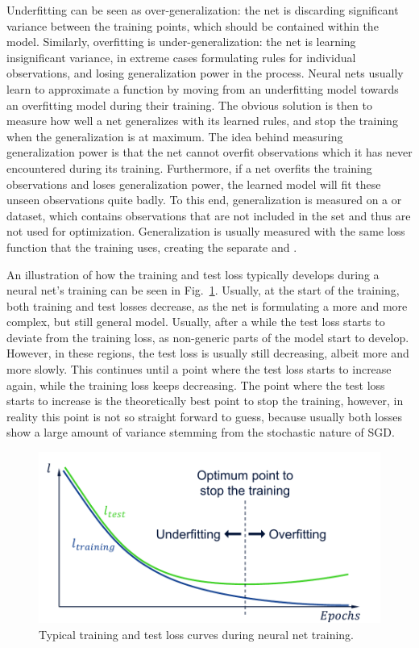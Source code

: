 		 	Underfitting can be seen as over-generalization: the net is discarding significant variance between the training points, which should be contained within the model.
		 	Similarly, overfitting is under-generalization: the net is learning insignificant variance, in extreme cases formulating rules for individual observations, and losing generalization power in the process.
		 	Neural nets usually learn to approximate a function by moving from an underfitting model towards an overfitting model during their training.
		 	The obvious solution is then to measure how well a net generalizes with its learned rules, and stop the training when the generalization is at maximum.
		 	The idea behind measuring generalization power is that the net cannot overfit observations which it has never encountered during its training.
		 	Furthermore, if a net overfits the training observations and loses generalization power, the learned model will fit these unseen observations quite badly.
		 	To this end, generalization is measured on a  or  dataset, which contains observations that are not included in the  set and thus are not used for optimization.
		 	Generalization is usually measured with the same loss function that the training uses, creating the separate  and .
		 	
		 	An illustration of how the training and test loss typically develops during a neural net's training can be seen in Fig.~\ref{fig:learning_losses}.
		 	Usually, at the start of the training, both training and test losses decrease, as the net is formulating a more and more complex, but still general model.
		 	Usually, after a while the test loss starts to deviate from the training loss, as non-generic parts of the model start to develop.
		 	However, in these regions, the test loss is usually still decreasing, albeit more and more slowly.
		 	This continues until a point where the test loss starts to increase again, while the training loss keeps decreasing.
		 	The point where the test loss starts to increase is the theoretically best point to stop the training, however, in reality this point is not so straight forward to guess, because usually both losses show a large amount of variance stemming from the stochastic nature of \ac{SGD}.
		 	
			\begin{figure}[ht]
		 		\centering
	 			\includegraphics[width=0.6\linewidth]{figures/02_deep_learning/learning_losses/learning_losses.pdf}
		 		\caption[Losses during neural net training]{Typical training and test loss curves during neural net training.}
		 		\label{fig:learning_losses}
		 	\end{figure}
	 	
